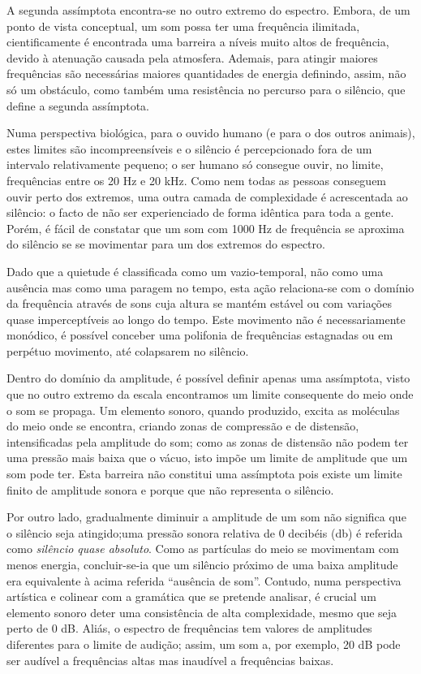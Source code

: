 \documentclass[../main.tex]{subfiles}
\begin{document}
A segunda assímptota encontra-se no outro extremo do espectro. Embora, de um ponto de vista conceptual, um som possa ter uma frequência ilimitada, cientificamente é encontrada uma barreira a níveis muito altos de frequência, devido à atenuação causada pela atmosfera\cite{ejakov,evans,benade}. Ademais, para atingir maiores frequências são necessárias maiores quantidades de energia definindo, assim, não só um obstáculo, como também uma resistência no percurso para o silêncio, que define a segunda assímptota.

Numa perspectiva biológica, para o ouvido humano (e para o dos outros animais), estes limites são incompreensíveis e o silêncio é percepcionado fora de um intervalo relativamente pequeno; o ser humano só consegue ouvir, no limite, frequências entre os 20 Hz e 20 kHz\cite{olson}. Como nem todas as pessoas conseguem ouvir perto dos extremos, uma outra camada de complexidade é acrescentada ao silêncio: o facto de não ser experienciado de forma idêntica para toda a gente. Porém, é fácil de constatar que um som com 1000 Hz de frequência se aproxima do silêncio se se movimentar para um dos extremos do espectro.

Dado que a quietude é classificada como um vazio-temporal, não como uma ausência mas como uma paragem no tempo, esta ação relaciona-se com o domínio da frequência através de sons cuja altura se mantém estável ou com variações quase imperceptíveis ao longo do tempo. Este movimento não é necessariamente monódico, é possível conceber uma polifonia de frequências estagnadas ou em perpétuo movimento, até colapsarem no silêncio.


Dentro do domínio da amplitude, é possível definir apenas uma assímptota, visto que no outro extremo da escala encontramos um limite consequente do meio onde o som se propaga. Um elemento sonoro, quando produzido, excita as moléculas do meio onde se encontra, criando zonas de compressão e de distensão, intensificadas pela amplitude do som; como as zonas de distensão não podem ter uma pressão mais baixa que o vácuo, isto impõe um limite de amplitude que um som pode ter\cite{self2020small}. Esta barreira não constitui uma assímptota pois existe um limite finito de amplitude sonora e porque que não representa o silêncio.

Por outro lado, gradualmente diminuir a amplitude de um som não significa que o silêncio seja atingido;uma pressão sonora relativa de 0 decibéis (db) é referida como \textsl{silêncio quase absoluto}. Como as partículas do meio se movimentam com menos energia, concluir-se-ia que um silêncio próximo de uma baixa amplitude era equivalente à acima referida \enquote{ausência de som}. Contudo, numa perspectiva artística e colinear com a gramática que se pretende analisar, é crucial um elemento sonoro deter uma consistência de alta complexidade, mesmo que seja perto de 0 dB. Aliás, o espectro de frequências tem valores de amplitudes diferentes para o limite de audição; assim, um som a, por exemplo, 20 dB pode ser audível a frequências altas mas inaudível a frequências baixas\cite{benade}.
\end{document}
